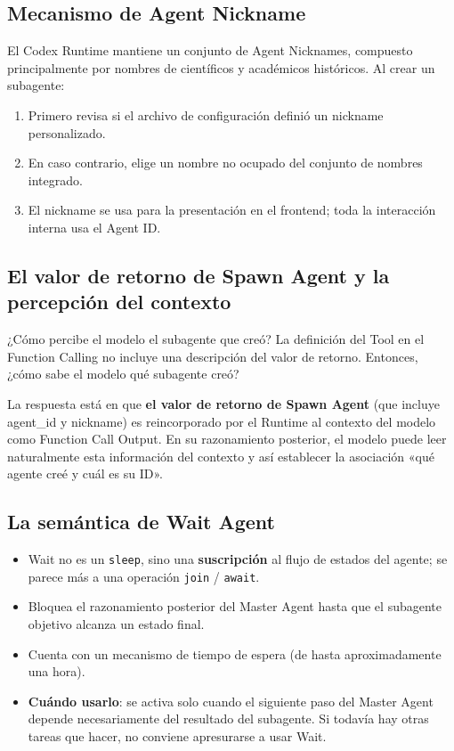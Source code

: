\subsection{Mecanismo de Agent Nickname}

El Codex Runtime mantiene un conjunto de Agent Nicknames, compuesto principalmente por nombres de científicos y académicos históricos. Al crear un subagente:
\begin{enumerate}
    \item Primero revisa si el archivo de configuración definió un nickname personalizado.
    \item En caso contrario, elige un nombre no ocupado del conjunto de nombres integrado.
    \item El nickname se usa para la presentación en el frontend; toda la interacción interna usa el Agent ID.
\end{enumerate}

\subsection{El valor de retorno de Spawn Agent y la percepción del contexto}

\begin{knowledgebox}{¿Cómo percibe el modelo el subagente que creó?}
La definición del Tool en el Function Calling no incluye una descripción del valor de retorno. Entonces, ¿cómo sabe el modelo qué subagente creó?

La respuesta está en que \textbf{el valor de retorno de Spawn Agent} (que incluye agent\_id y nickname) es reincorporado por el Runtime al contexto del modelo como Function Call Output. En su razonamiento posterior, el modelo puede leer naturalmente esta información del contexto y así establecer la asociación «qué agente creé y cuál es su ID».
\end{knowledgebox}

\subsection{La semántica de Wait Agent}

\begin{itemize}
    \item Wait no es un \texttt{sleep}, sino una \textbf{suscripción} al flujo de estados del agente; se parece más a una operación \texttt{join} / \texttt{await}.
    \item Bloquea el razonamiento posterior del Master Agent hasta que el subagente objetivo alcanza un estado final.
    \item Cuenta con un mecanismo de tiempo de espera (de hasta aproximadamente una hora).
    \item \textbf{Cuándo usarlo}: se activa solo cuando el siguiente paso del Master Agent depende necesariamente del resultado del subagente. Si todavía hay otras tareas que hacer, no conviene apresurarse a usar Wait.
\end{itemize}


